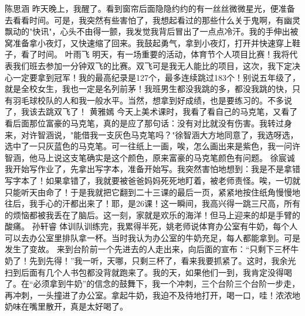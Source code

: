 {}\markdownRendererInterblockSeparator
{}陈思涵\markdownRendererInterblockSeparator
{}昨天晚上，我醒了。看到窗帘后面隐隐约约的有一丝丝微微星光，便准备去看看时间。可是，我突然有些害怕了，我想起看过的那些什么关于鬼啊，有幽灵飘动的"快讯"，心头不由得一颤，我发觉我背后冒出了一点点冷汗。我的手伸出被窝准备拿小夜灯，又快速缩了回来。我鼓起勇气，拿到小夜灯，打开并快速穿上鞋子，看了时间。\markdownRendererInterblockSeparator
{}\markdownRendererInterblockSeparator
{}叶雨飞\markdownRendererInterblockSeparator
{}明天，有一场重要的活动，体育节个人项目比赛！我将代表我们班去参加一分钟双飞的比赛。双飞可是我无人能比的项目，这次，我下定决心一定要拿到冠军！我的最高纪录是127个，最多连续跳过183个！别说五年级了，就是全校女生，我也一定是名列前茅！我班男生都没我跳的多，都没我跳的快，只有羽毛球校队的人和我一般水平。当然，想拿到好成绩，也是要练习的。不多说了，我该去跳双飞了！\markdownRendererInterblockSeparator
{}\markdownRendererInterblockSeparator
{}黄雅嫣\markdownRendererInterblockSeparator
{}今天上美术课时，我看了看自己的马克笔，又看了看后面那位富豪的马克笔，真的是应了那句话：没有对比就没有伤害。我转过身来，对许智涵说，"能借我一支灰色马克笔吗？"徐智涵大方地同意了，我选呀选，选中了一只灰蓝色的马克笔。可一往纸上一画，唉，怎么画出来是紫色，我一问许智涵，他马上说这支笔确实是这个颜色，原来富豪的马克笔颜色有问题。\markdownRendererInterblockSeparator
{}\markdownRendererInterblockSeparator
{}徐宸诚\markdownRendererInterblockSeparator
{}我开始写作业了，先拿出写字本，准备开始写。我突然害怕地想到：我是不是拿错写字本了！如果拿错了，我就要被爸爸妈妈死死地盯着，被老师责怪。唉，一切就只能听天由命了！于是我就把它翻到二十三课的最后一页，紧紧地按住纸角慢慢地往后，我手心的汗都出来了！耶，是26课！这一瞬间，我高兴得一跳三尺高，所有的烦恼都被我丢在了脑后。这一刻，家就是欢乐的海洋！但马上迎来的却是手臂的酸痛。\markdownRendererInterblockSeparator
{}\markdownRendererInterblockSeparator
{}孙轩睿\markdownRendererInterblockSeparator
{}体训队训练完，我累得半死，姚老师说体育办公室有牛奶，每个人可以去办公室里排队拿一杯。当时我认为办公室的牛奶充足，每人都能拿到。可是发生了变故。\markdownRendererInterblockSeparator
{}来到台阶前一个先进去的人走出来，向后面的宣布：“只剩下三杯牛奶了！先到先得！”我一听，天哪，只剩三杯了，看来我要抓紧了。这时，我余光扫到后面有几个人书包都没背就跑来了。我的天，如果他们一到，我肯定没得喝了。在“必须拿到牛奶”的信念的鼓舞下，我一个冲刺，三个台阶三个台阶一步走，再冲刺，一头撞进了办公室。拿起牛奶，我迫不及待地打开，喝一口，哇！浓浓地奶味在嘴里散开，真是太好喝了。\markdownRendererInterblockSeparator
